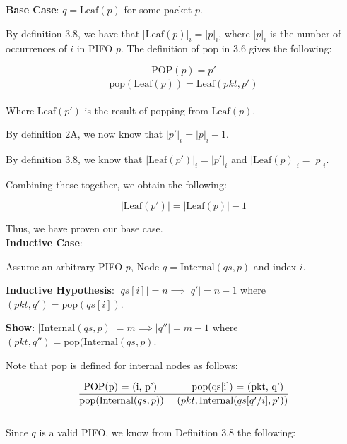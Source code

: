 \documentclass{article}
\begin{document}
\noindent \textbf{Base Case}: $q = \text{Leaf}(p)$ for some packet $p$.\newline

\noindent By definition 3.8, we have that $|\text{Leaf}(p)|_i = |p|_i$, where $|p|_i$ is the number of occurrences of $i$ in PIFO $p$. The definition of $\text{pop}$ in 3.6 gives the following:

$$\frac{\text{POP}(p) = p'}{\text{pop}(\text{Leaf}(p)) = \text{Leaf}(pkt, p')}$$\\[-10pt]

\noindent Where $\text{Leaf}(p')$ is the result of $\text{pop}$ping from $\text{Leaf}(p)$.\newline

\noindent By definition 2A, we now know that $|p'|_i = |p|_i - 1$.\newline

\noindent By definition 3.8, we know that $|\text{Leaf}(p')|_i = |p'|_i$ and $|\text{Leaf}(p)|_i = |p|_i$.\newline

\noindent Combining these together, we obtain the following:

$$|\text{Leaf}(p')| = |\text{Leaf}(p)| - 1$$

\noindent Thus, we have proven our base case.\\[10pt]

\noindent \textbf{Inductive Case}:\newline

\noindent Assume an arbitrary PIFO $p$, Node $q = \text{Internal}(qs, p)$ and index $i$.\newline

\noindent \textbf{Inductive Hypothesis}: $|qs[i]| = n \implies |q'| = n-1$ where $(pkt, q') = \text{pop}(qs[i])$.\newline

\noindent \textbf{Show}: $|\text{Internal}(qs, p)| = m \implies |q''| = m-1$ where $(pkt, q'') =\text{pop}(\text{Internal}(qs, p)$.\newline

\noindent Note that $\text{pop}$ is defined for internal nodes as follows:

$$\frac{\text{POP(p) = (i, p') \hspace{1cm} \text{pop}(qs[i]) = (pkt, q')}}{{\text{pop}(\text{Internal}(qs, p)) = (pkt, \text{Internal}(qs[q'/i], p'))}}$$\\[-10pt]

\noindent Since $q$ is a valid PIFO, we know from Definition 3.8 the following:
\end{document}
